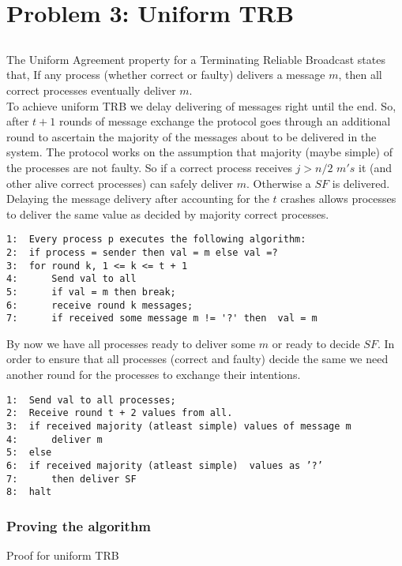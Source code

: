 \documentclass[11pt,a4paper]{article}
\begin{document}
\section{Problem 3: Uniform TRB}
\subsection{}
The Uniform Agreement property for a Terminating Reliable Broadcast states that, 
If any process (whether correct or faulty) delivers a message $m$, then all correct processes eventually 
deliver $m$.\\

To achieve uniform TRB we delay delivering of messages right until the end. So, after $t+1$ rounds of 
message exchange the protocol goes through an additional round to ascertain the majority of the 
messages about to be delivered in the system. The protocol works on the assumption that majority (maybe simple)
of the processes are not faulty. So if a correct process receives $j>n/2 $ $m's$ it (and other alive correct processes) can safely
deliver $m$. Otherwise a $SF$ is delivered.
Delaying the message delivery after accounting for the $t$ crashes allows processes to deliver the same value
as decided by majority correct processes.

\begin{verbatim}
1:  Every process p executes the following algorithm:
2:  if process = sender then val = m else val =?
3:  for round k, 1 <= k <= t + 1
4:      Send val to all
5:      if val = m then break;
6:      receive round k messages;
7:      if received some message m != '?' then	val = m 

\end{verbatim}

By now we have all processes ready to deliver some $m$ or ready to decide $SF$. In order to ensure that all 
processes (correct and faulty) decide the same we need another round for the processes to exchange their
intentions.

\begin{verbatim}
1:  Send val to all processes;
2:  Receive round t + 2 values from all.
3:  if received majority (atleast simple) values of message m
4:      deliver m
5:  else
6:  if received majority (atleast simple)  values as ’?’
7:      then deliver SF
8:  halt
\end{verbatim}


\subsubsection*{Proving the algorithm}
Proof for uniform TRB\\
\end{document}
